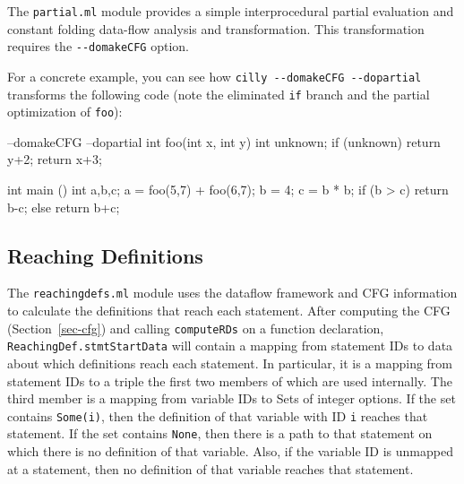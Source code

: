 \documentclass{article}
\def\secref#1{Section~\ref{sec-#1}}
\def\t#1{{\tt #1}}
\begin{document}
The \t{partial.ml} module provides a simple interprocedural partial
evaluation and constant folding data-flow analysis and transformation. This
transformation requires the \t{-{}-domakeCFG} option. 

For a concrete example, you can see how \t{cilly -{}-domakeCFG -{}-dopartial}
transforms the following code (note the eliminated \t{if} branch and the
partial optimization of \t{foo}): 

\begin{cilcode}[global] --domakeCFG --dopartial
  int foo(int x, int y) {
    int unknown;
    if (unknown)
      return y+2;     
    return x+3;      
  }

  int main () {
    int a,b,c;
    a = foo(5,7) + foo(6,7);
    b = 4;
    c = b * b;      
    if (b > c)     
      return b-c;
    else
      return b+c; 
  }
\end{cilcode}

\subsection{Reaching Definitions}

The \t{reachingdefs.ml} module uses the dataflow framework and CFG
information to calculate the definitions that reach each
statement. After computing the CFG (\secref{cfg}) and calling
\t{computeRDs} on a 
function declaration, \t{ReachingDef.stmtStartData} will contain a
mapping from statement IDs to data about which definitions reach each
statement. In particular, it is a mapping from statement IDs to a
triple the first two members of which are used internally. The third
member is a mapping from variable IDs to Sets of integer options. If
the set contains \t{Some(i)}, then the definition of that variable
with ID \t{i} reaches that statement. If the set contains \t{None},
then there is a path to that statement on which there is no definition
of that variable.  Also, if the variable ID is unmapped at a
statement, then no definition of that variable reaches that statement.
\end{document}
